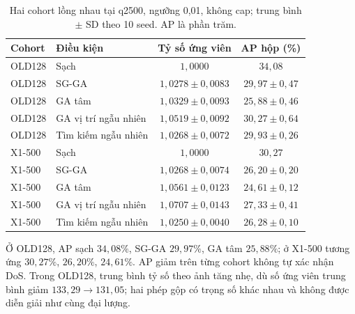 \documentclass[a4paper,fleqn]{cas-dc}
\begin{document}
\begin{table}[t]\centering\small
\caption{Hai cohort lồng nhau tại q2500, ngưỡng 0,01, không cap; trung bình $\pm$ SD theo 10 seed. AP là phần trăm.}
\begin{tabularx}{\textwidth}{@{}l X c c@{}}\toprule Cohort & Điều kiện & Tỷ số ứng viên & AP hộp (\%) \\ \midrule
OLD128 & Sạch & $1{,}0000$ & $34{,}08$ \\
OLD128 & SG-GA & $1{,}0278\pm0{,}0083$ & $29{,}97\pm0{,}47$ \\
OLD128 & GA tâm & $1{,}0329\pm0{,}0093$ & $25{,}88\pm0{,}46$ \\
OLD128 & GA vị trí ngẫu nhiên & $1{,}0519\pm0{,}0092$ & $30{,}27\pm0{,}64$ \\
OLD128 & Tìm kiếm ngẫu nhiên & $1{,}0268\pm0{,}0072$ & $29{,}93\pm0{,}26$ \\
\midrule
X1-500 & Sạch & $1{,}0000$ & $30{,}27$ \\
X1-500 & SG-GA & $1{,}0268\pm0{,}0074$ & $26{,}20\pm0{,}20$ \\
X1-500 & GA tâm & $1{,}0561\pm0{,}0123$ & $24{,}61\pm0{,}12$ \\
X1-500 & GA vị trí ngẫu nhiên & $1{,}0707\pm0{,}0143$ & $27{,}33\pm0{,}41$ \\
X1-500 & Tìm kiếm ngẫu nhiên & $1{,}0250\pm0{,}0040$ & $26{,}28\pm0{,}10$ \\
\bottomrule\end{tabularx}\label{tab:sponge_primary}\end{table}

Ở OLD128, AP sạch $34{,}08\%$, SG-GA $29{,}97\%$, GA tâm $25{,}88\%$; ở X1-500 tương ứng $30{,}27\%$, $26{,}20\%$, $24{,}61\%$. AP giảm trên từng cohort không tự xác nhận DoS. Trong OLD128, trung bình tỷ số theo ảnh tăng nhẹ, dù số ứng viên trung bình giảm $133{,}29\to131{,}05$; hai phép gộp có trọng số khác nhau và không được diễn giải như cùng đại lượng.
\end{document}
